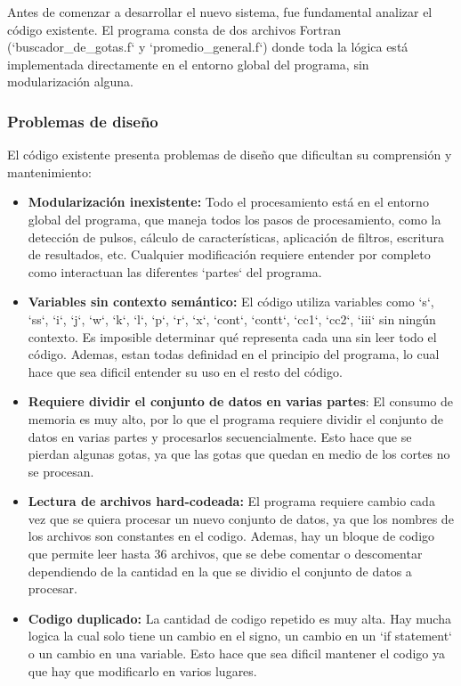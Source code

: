 \documentclass[12pt,a4paper]{article}
\begin{document}
Antes de comenzar a desarrollar el nuevo sistema, fue fundamental analizar el código existente. El programa consta de dos archivos Fortran (`buscador\_de\_gotas.f` y `promedio\_general.f`) donde toda la lógica está implementada directamente en el entorno global del programa, sin modularización alguna. 



\subsubsection{Problemas de diseño}

El código existente presenta problemas de diseño que dificultan su comprensión y mantenimiento:

\begin{itemize}

\item \textbf{Modularización inexistente:} Todo el procesamiento está en el entorno global del programa, que maneja todos los pasos de procesamiento, como la detección de pulsos, cálculo de características, aplicación de filtros, escritura de resultados, etc. Cualquier modificación requiere entender por completo como interactuan las diferentes `partes` del programa.

\item \textbf{Variables sin contexto semántico:} El código utiliza variables como `s`, `ss`, `i`,
`j`, `w`, `k`, `l`, `p`, `r`, `x`, `cont`, `contt`, `cc1`, `cc2`, `iii` sin ningún contexto. Es
imposible determinar qué representa cada una sin leer todo el código. Ademas, estan todas definidad en el principio del programa, lo cual hace que sea dificil entender su uso en el resto del código.
    
\item \textbf{Requiere dividir el conjunto de datos en varias partes}: El consumo de memoria es muy alto, por lo que el programa requiere dividir el conjunto de datos en varias partes y procesarlos secuencialmente. Esto hace que se pierdan algunas gotas, ya que las gotas que quedan en medio de los cortes no se procesan.

\item \textbf{Lectura de archivos hard-codeada:} El programa requiere cambio cada vez que se quiera procesar un nuevo conjunto de datos, ya que los nombres de los archivos son constantes en el codigo. Ademas, hay un bloque de codigo que permite leer hasta 36 archivos, que se debe comentar o descomentar dependiendo de la cantidad en la que se dividio el conjunto de datos a procesar.

\item \textbf{Codigo duplicado:} La cantidad de codigo repetido es muy alta. Hay mucha logica la cual solo tiene un cambio en el signo, un cambio en un `if statement` o un cambio en una variable. Esto hace que sea dificil mantener el codigo ya que hay que modificarlo en varios lugares.

\end{itemize}
\end{document}
